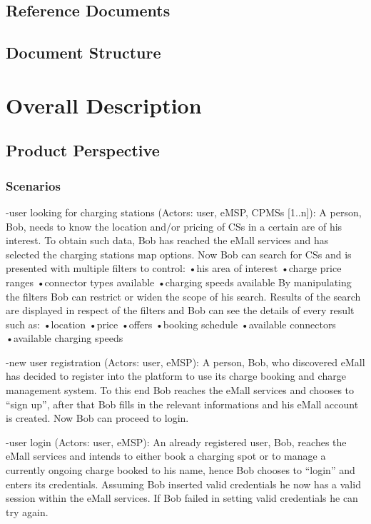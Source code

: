 \documentclass[12pt]{article}
\begin{document}
\subsection{Reference Documents}

\subsection{Document Structure}

\section{Overall Description}

\subsection{Product Perspective}

\subsubsection{Scenarios}

-user looking for charging stations (Actors: user, eMSP, CPMSs [1..n]):
A person, Bob, needs to know the location and/or pricing of CSs in a certain are of his interest. To obtain such data, Bob has reached the eMall services and has selected the charging stations map options. Now Bob can search for CSs and is presented with multiple filters to control:
•his area of interest
•charge price ranges
•connector types available
•charging speeds available
By manipulating the filters Bob can restrict or widen the scope of his search. Results of the search are displayed in respect of the filters and Bob can see the details of every result such as:
•location
•price
•offers
•booking schedule
•available connectors
•available charging speeds

-new user registration (Actors: user, eMSP):
A person, Bob, who discovered eMall has decided to register into the platform to use its charge booking and charge management system. To this end Bob reaches the eMall services and chooses to “sign up”, after that Bob fills in the relevant informations and his eMall account is created. Now Bob can proceed to login.

-user login (Actors: user, eMSP):
An already registered user, Bob, reaches the eMall services and intends to either book a charging spot or to manage a currently ongoing charge booked to his name, hence Bob chooses to “login” and enters its credentials. Assuming Bob inserted valid credentials he now has a valid session within the eMall services. If Bob failed in setting valid credentials he can try again.
\end{document}
